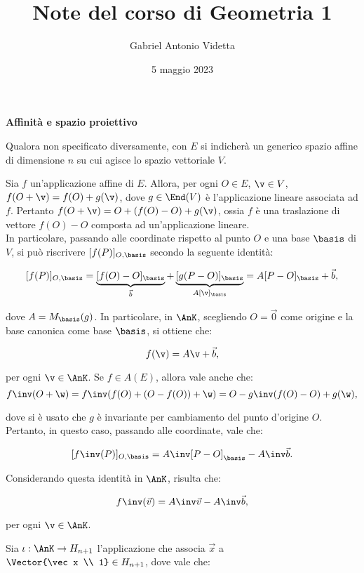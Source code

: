 \documentclass[11pt]{article}
\title{\textbf{Note del corso di Geometria 1}}
\author{Gabriel Antonio Videtta}
\date{5 maggio 2023}
\begin{document}
	
	\maketitle
	
	\begin{center}
		\Large \textbf{Affinità e spazio proiettivo}
	\end{center}
	
	\begin{note}
		Qualora non specificato diversamente, con $E$ si indicherà un
		generico spazio affine di dimensione $n$ su cui agisce lo
		spazio vettoriale $V$.
	\end{note}
	
	Sia $f$ un'applicazione affine di $E$. Allora, per ogni $O \in E$, $\v \in V$,
	$f(O + \v) = f(O) + g(\v)$, dove $g \in \End(V)$ è l'applicazione lineare
	associata ad $f$. Pertanto $f(O + \v) = O + (f(O) - O) + g(\v)$, ossia
	$f$ è una traslazione di vettore $f(O) - O$ composta ad un'applicazione
	lineare. \\
	
	In particolare, passando alle coordinate rispetto al punto $O$ e una
	base $\basis$ di $V$, si può riscrivere $[f(P)]_{O, \basis}$ secondo
	la seguente identità:
	
	\[ [f(P)]_{O, \basis} = \underbrace{[f(O) - O]_{\basis}}_{\vec b} + \underbrace{[g(P - O)]_{\basis}}_{A [\v]_\basis} = A [P - O]_\basis + \vec b, \]
	
	dove $A = M_\basis(g)$. In particolare, in $\AnK$, scegliendo $O = \vec 0$ come origine e la base canonica
	come base $\basis$, si ottiene che:
	
	\[ f(\v) = A \v + \vec b, \]
	
	per ogni $\v \in \AnK$. Se $f \in A(E)$, allora vale anche che:
	\[ f\inv(O + \w) = f\inv(f(O) + (O - f(O)) + \w) = O - g\inv(f(O) - O) + g(\w), \]
	
	dove si è usato che $g$ è invariante per cambiamento del punto d'origine $O$. Pertanto,
	in questo caso, passando alle coordinate, vale che:
	
	\[ [f\inv(P)]_{O, \basis} = A\inv [P - O]_\basis - A\inv \vec b. \]
	
	Considerando questa identità in $\AnK$, risulta che:
	
	\[ f\inv(\vec v) = A\inv \vec v - A\inv \vec b, \]
	
	per ogni $\v \in \AnK$.
	
	\hr \vskip 0.1in

	Sia $\iota : \AnK \to H_{n+1}$ l'applicazione che associa $\vec x$ a $\Vector{\vec x \\ 1} \in H_{n+1}$,
	dove vale che:
	
\end{document}
